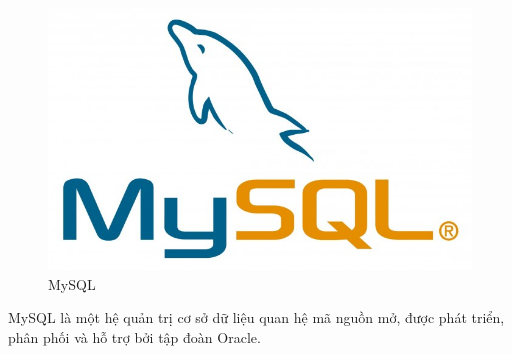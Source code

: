 \begin{figure}[!h]
    \centering
    \includegraphics[scale=0.5]{img/mysql.jpg}
    \caption{MySQL}
\end{figure}

MySQL là một hệ quản trị cơ sở dữ liệu quan hệ mã nguồn mở, được phát triển, phân phối và hỗ trợ bởi tập đoàn Oracle.\\

